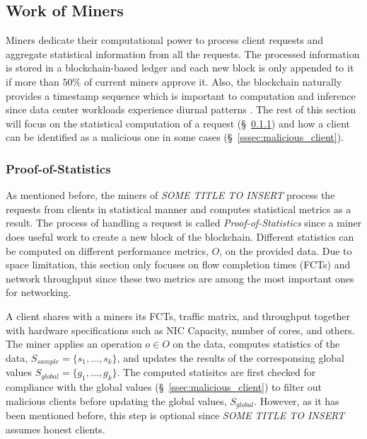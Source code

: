 \documentclass{article}
\newcommand{\projTitle}{SOME TITLE TO INSERT}
\begin{document}
\subsection{Work of Miners}\label{ssec:work_of_miners}
Miners dedicate their computational power to process client requests and aggregate statistical information from all the requests. The processed information is stored in a blockchain-based ledger and each new block is only appended to it if more than $50\%$ of current miners approve it. Also, the blockchain naturally provides a timestamp sequence which is important to computation and inference since data center workloads experience diurnal patterns \cite{diurnal_pattern_data_center_1, diurnal_pattern_data_center_2}. The rest of this section will focus on the statistical computation of a request (\S\ \ref{sssec:proof_of_statistics}) and how a client can be identified as a malicious one in some cases (\S\ \ref{sssec:malicious_client}). 

\subsubsection{Proof-of-Statistics}\label{sssec:proof_of_statistics}
As mentioned before, the miners of \textit{\projTitle} process the requests from clients in statistical manner and computes statistical metrics as a result. The process of handling a request is called \textit{Proof-of-Statistics} since a miner does useful work to create a new block of the blockchain. Different statistics can be  computed on different performance metrics, $O$, on the provided data. Due to space limitation, this section only focuses on flow completion times (FCTs) and network throughput since these two metrics are among the most important ones for networking. 

\noindent \newline A client shares with a miners its FCTs, traffic matrix, and throughput together with hardware specifications such as NIC Capacity, number of cores, and others. The miner applies an operation $o \in O$ on the data, computes statistics of the data, $S_{sample} = \{s_1, ..., s_k\}$, and updates the results of the corresponsing global values $S_{global} = \{g_1, ..., g_k\}$. 
The computed statisitcs are first checked for compliance with the global values (\S\ \ref{ssec:malicious_client}) to filter out malicious clients before updating the global values, $S_{global}$. However, as it has been mentioned before, this step is optional since \textit{\projTitle} assumes honest clients.
\end{document}
